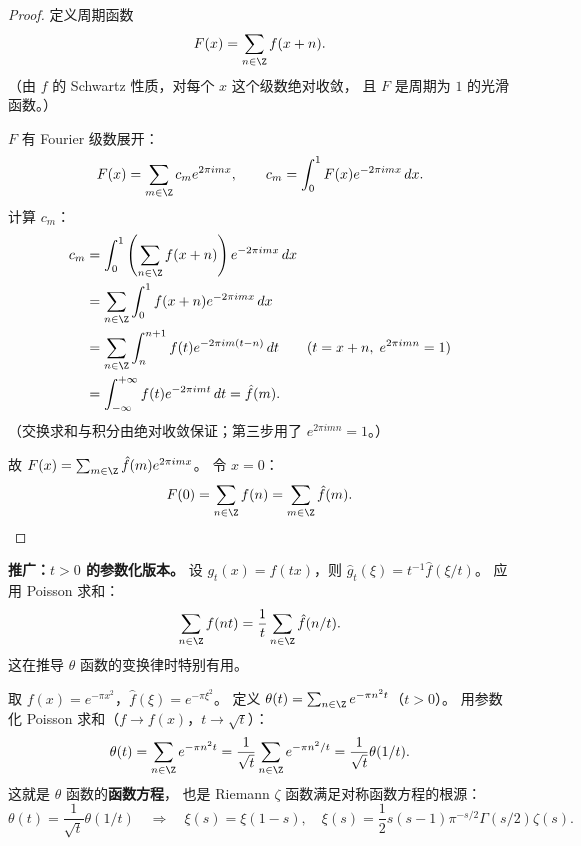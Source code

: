 \begin{proof}
定义周期函数
\[
  F(x) = \sum_{n \in \Z} f(x + n).
\]
（由 $f$ 的 Schwartz 性质，对每个 $x$ 这个级数绝对收敛，
且 $F$ 是周期为 $1$ 的光滑函数。）

$F$ 有 Fourier 级数展开：
\[
  F(x) = \sum_{m \in \Z} c_m e^{2\pi i mx},
  \qquad c_m = \int_0^1 F(x) e^{-2\pi imx}\, dx.
\]
计算 $c_m$：
\begin{align}
  c_m
  &= \int_0^1 \left(\sum_{n \in \Z} f(x+n)\right) e^{-2\pi imx}\, dx \\
  &= \sum_{n \in \Z} \int_0^1 f(x+n) e^{-2\pi imx}\, dx \\
  &= \sum_{n \in \Z} \int_n^{n+1} f(t) e^{-2\pi im(t-n)}\, dt
    \qquad (t = x + n,\; e^{2\pi imn} = 1) \\
  &= \int_{-\infty}^{+\infty} f(t) e^{-2\pi imt}\, dt = \hat{f}(m).
\end{align}
（交换求和与积分由绝对收敛保证；第三步用了 $e^{2\pi imn} = 1$。）

故 $F(x) = \sum_{m \in \Z} \hat{f}(m) e^{2\pi imx}$。
令 $x = 0$：
\[
  F(0) = \sum_{n \in \Z} f(n) = \sum_{m \in \Z} \hat{f}(m). \qedhere
\]
\end{proof}

\textbf{推广：$t > 0$ 的参数化版本。}
设 $g_t(x) = f(tx)$，则 $\hat{g}_t(\xi) = t^{-1}\hat{f}(\xi/t)$。
应用 Poisson 求和：
\[
  \sum_{n \in \Z} f(nt) = \frac{1}{t} \sum_{n \in \Z} \hat{f}(n/t).
\]
这在推导 $\theta$ 函数的变换律时特别有用。

\begin{example}
\label{ex:theta-poisson}
取 $f(x) = e^{-\pi x^2}$，$\hat{f}(\xi) = e^{-\pi\xi^2}$。
定义 $\theta(t) = \sum_{n \in \Z} e^{-\pi n^2 t}$（$t > 0$）。
用参数化 Poisson 求和（$f \to f(x)$，$t \to \sqrt{t}$）：
\[
  \theta(t) = \sum_{n \in \Z} e^{-\pi n^2 t}
  = \frac{1}{\sqrt{t}} \sum_{n \in \Z} e^{-\pi n^2/t}
  = \frac{1}{\sqrt{t}} \theta(1/t).
\]
这就是 $\theta$ 函数的\textbf{函数方程}，
也是 Riemann $\zeta$ 函数满足对称函数方程的根源：
\[
  \theta(t) = \frac{1}{\sqrt{t}} \theta(1/t)
  \quad \Longrightarrow \quad
  \xi(s) = \xi(1-s),
  \quad \xi(s) = \frac{1}{2}s(s-1)\pi^{-s/2}\Gamma(s/2)\zeta(s).
\]
\end{example}

